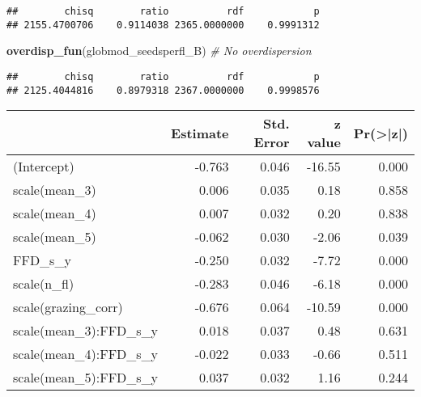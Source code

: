 \documentclass[
]{article}
\newenvironment{Shaded}{\begin{snugshade}}{\end{snugshade}}
\newcommand{\CommentTok}[1]{\textcolor[rgb]{0.56,0.35,0.01}{\textit{#1}}}
\newcommand{\DataTypeTok}[1]{\textcolor[rgb]{0.13,0.29,0.53}{#1}}
\newcommand{\DecValTok}[1]{\textcolor[rgb]{0.00,0.00,0.81}{#1}}
\newcommand{\KeywordTok}[1]{\textcolor[rgb]{0.13,0.29,0.53}{\textbf{#1}}}
\newcommand{\NormalTok}[1]{#1}
\newcommand{\OperatorTok}[1]{\textcolor[rgb]{0.81,0.36,0.00}{\textbf{#1}}}
\begin{document}
\begin{verbatim}
##        chisq        ratio          rdf            p 
## 2155.4700706    0.9114038 2365.0000000    0.9991312
\end{verbatim}

\begin{Shaded}
\begin{Highlighting}[]
\KeywordTok{overdisp_fun}\NormalTok{(globmod_seedsperfl_B) }\CommentTok{# No overdispersion}
\end{Highlighting}
\end{Shaded}

\begin{verbatim}
##        chisq        ratio          rdf            p 
## 2125.4044816    0.8979318 2367.0000000    0.9998576
\end{verbatim}

\begin{Shaded}
\end{Shaded}

\begin{table}

\centering
\begin{tabular}[t]{l|r|r|r|r}
\hline
  & Estimate & Std. Error & z value & Pr(>|z|)\\
\hline
(Intercept) & -0.763 & 0.046 & -16.55 & 0.000\\
\hline
scale(mean\_3) & 0.006 & 0.035 & 0.18 & 0.858\\
\hline
scale(mean\_4) & 0.007 & 0.032 & 0.20 & 0.838\\
\hline
scale(mean\_5) & -0.062 & 0.030 & -2.06 & 0.039\\
\hline
FFD\_s\_y & -0.250 & 0.032 & -7.72 & 0.000\\
\hline
scale(n\_fl) & -0.283 & 0.046 & -6.18 & 0.000\\
\hline
scale(grazing\_corr) & -0.676 & 0.064 & -10.59 & 0.000\\
\hline
scale(mean\_3):FFD\_s\_y & 0.018 & 0.037 & 0.48 & 0.631\\
\hline
scale(mean\_4):FFD\_s\_y & -0.022 & 0.033 & -0.66 & 0.511\\
\hline
scale(mean\_5):FFD\_s\_y & 0.037 & 0.032 & 1.16 & 0.244\\
\hline
\end{tabular}
\centering
\begin{tabular}[t]{}
\hline

\hline
\end{tabular}
\centering
\begin{tabular}[t]{}
\hline

\hline
\end{tabular}
\end{table}
\end{document}
